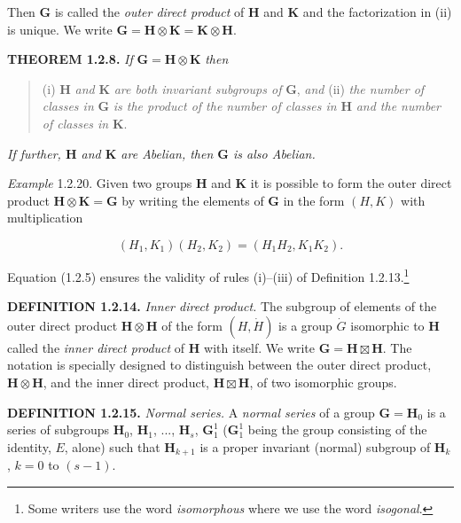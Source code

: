 \documentclass[11pt,a4paper,twoside,openright]{book}
\begin{document}
Then $\mathbf{G}$ is called the \textit{outer direct product} of $\mathbf{H}$ and $\mathbf{K}$ and the factorization in (ii) is unique. We write $\mathbf{G} = \mathbf{H} \otimes \mathbf{K} = \mathbf{K} \otimes \mathbf{H}$.

\textbf{THEOREM 1.2.8.} \textit{If} $\mathbf{G} = \mathbf{H} \otimes \mathbf{K}$ \textit{then}

\begin{quote}(i) $\mathbf{H}$ \textit{and} $\mathbf{K}$ \textit{are both invariant subgroups of} $\mathbf{G}$, \textit{and} (ii) \textit{the number of classes in} $\mathbf{G}$ \textit{is the product of the number of classes in} $\mathbf{H}$ \textit{and the number of classes in} $\mathbf{K}$.\end{quote}

\textit{If further, $\mathbf{H}$ and $\mathbf{K}$ are Abelian, then $\mathbf{G}$ is also Abelian.}

\textit{Example} 1.2.20. Given two groups $\mathbf{H}$ and $\mathbf{K}$ it is possible to form the outer direct product $\mathbf{H} \otimes \mathbf{K} = \mathbf{G}$ by writing the elements of $\mathbf{G}$ in the form $(H, K)$ with multiplication

\begin{equation*}
(H_{1}, K_{1})(H_{2}, K_{2}) = (H_{1}H_{2}, K_{1}K_{2}). \tag{1.2.5}
\end{equation*}

Equation (1.2.5) ensures the validity of rules (i)–(iii) of Definition 1.2.13.\footnote{Some writers use the word \textit{isomorphous} where we use the word \textit{isogonal}.}

\textbf{DEFINITION 1.2.14.} \textit{Inner direct product.} The subgroup of elements of the outer direct product $\mathbf{H} \otimes \mathbf{H}$ of the form $(H, \dot{H})$ is a group $\dot{G}$ isomorphic to $\mathbf{H}$ called the \textit{inner direct product} of $\mathbf{H}$ with itself. We write $\mathbf{G} = \mathbf{H} \boxtimes \mathbf{H}$. The notation is specially designed to distinguish between the outer direct product, $\mathbf{H} \otimes \mathbf{H}$, and the inner direct product, $\mathbf{H} \boxtimes \mathbf{H}$, of two isomorphic groups.

\textbf{DEFINITION 1.2.15.} \textit{Normal series.} A \textit{normal series} of a group $\mathbf{G} = \mathbf{H}_{0}$ is a series of subgroups $\mathbf{H}_{0}$, $\mathbf{H}_{1}$, ..., $\mathbf{H}_{s}$, $\mathbf{G}_1^1$ ($\mathbf{G}_1^1$ being the group consisting of the identity, $E$, alone) such that $\mathbf{H}_{k+1}$ is a proper invariant (normal) subgroup of $\mathbf{H}_{k}$, $k = 0$ to $(s-1)$.
\end{document}
